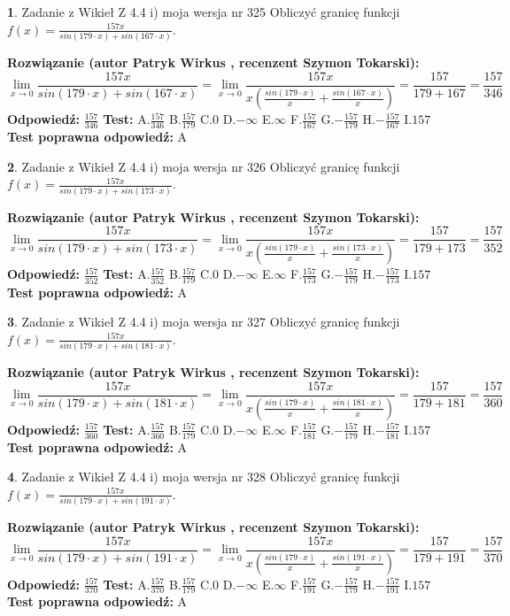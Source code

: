 \documentclass[12pt, a4paper]{article}
\theoremstyle{definition} %
\newtheorem{zad}{}
\newcommand{\zadStart}[1]{\begin{zad}#1\newline}
\newcommand{\zadStop}{\end{zad}}
\newcommand{\rozwStart}[2]{\noindent \textbf{Rozwiązanie (autor #1 , recenzent #2): }\newline}
\newcommand{\rozwStop}{\newline}
\newcommand{\odpStart}{\noindent \textbf{Odpowiedź:}\newline}
\newcommand{\odpStop}{\newline}
\newcommand{\testStart}{\noindent \textbf{Test:}\newline}
\newcommand{\testStop}{\newline}
\newcommand{\kluczStart}{\noindent \textbf{Test poprawna odpowiedź:}\newline}
\newcommand{\kluczStop}{\newline}
\begin{document}
\zadStart{Zadanie z Wikieł Z 4.4 i) moja wersja nr 325}
Obliczyć granicę funkcji $f(x)=\frac{157x}{sin(179\cdot x) +sin(167\cdot x)}$.
\zadStop
\rozwStart{Patryk Wirkus}{Szymon Tokarski}
$$\lim\limits_{x\to 0}\frac{157x}{sin(179\cdot x) +sin(167\cdot x)}=\lim\limits_{x\to 0}\frac{157x}{x(\frac{sin(179\cdot x)}{x}+\frac{sin(167\cdot x)}{x})}=\frac{157}{179+167} = \frac{157}{346}$$
\rozwStop
\odpStart
$\frac{157}{346}$
\odpStop
\testStart
A.$\frac{157}{346}$
B.$\frac{157}{179}$
C.$0$
D.$-\infty$
E.$\infty$
F.$\frac{157}{167}$
G.$-\frac{157}{179}$
H.$-\frac{157}{167}$
I.$157$
\testStop
\kluczStart
A
\kluczStop



\zadStart{Zadanie z Wikieł Z 4.4 i) moja wersja nr 326}
Obliczyć granicę funkcji $f(x)=\frac{157x}{sin(179\cdot x) +sin(173\cdot x)}$.
\zadStop
\rozwStart{Patryk Wirkus}{Szymon Tokarski}
$$\lim\limits_{x\to 0}\frac{157x}{sin(179\cdot x) +sin(173\cdot x)}=\lim\limits_{x\to 0}\frac{157x}{x(\frac{sin(179\cdot x)}{x}+\frac{sin(173\cdot x)}{x})}=\frac{157}{179+173} = \frac{157}{352}$$
\rozwStop
\odpStart
$\frac{157}{352}$
\odpStop
\testStart
A.$\frac{157}{352}$
B.$\frac{157}{179}$
C.$0$
D.$-\infty$
E.$\infty$
F.$\frac{157}{173}$
G.$-\frac{157}{179}$
H.$-\frac{157}{173}$
I.$157$
\testStop
\kluczStart
A
\kluczStop



\zadStart{Zadanie z Wikieł Z 4.4 i) moja wersja nr 327}
Obliczyć granicę funkcji $f(x)=\frac{157x}{sin(179\cdot x) +sin(181\cdot x)}$.
\zadStop
\rozwStart{Patryk Wirkus}{Szymon Tokarski}
$$\lim\limits_{x\to 0}\frac{157x}{sin(179\cdot x) +sin(181\cdot x)}=\lim\limits_{x\to 0}\frac{157x}{x(\frac{sin(179\cdot x)}{x}+\frac{sin(181\cdot x)}{x})}=\frac{157}{179+181} = \frac{157}{360}$$
\rozwStop
\odpStart
$\frac{157}{360}$
\odpStop
\testStart
A.$\frac{157}{360}$
B.$\frac{157}{179}$
C.$0$
D.$-\infty$
E.$\infty$
F.$\frac{157}{181}$
G.$-\frac{157}{179}$
H.$-\frac{157}{181}$
I.$157$
\testStop
\kluczStart
A
\kluczStop



\zadStart{Zadanie z Wikieł Z 4.4 i) moja wersja nr 328}
Obliczyć granicę funkcji $f(x)=\frac{157x}{sin(179\cdot x) +sin(191\cdot x)}$.
\zadStop
\rozwStart{Patryk Wirkus}{Szymon Tokarski}
$$\lim\limits_{x\to 0}\frac{157x}{sin(179\cdot x) +sin(191\cdot x)}=\lim\limits_{x\to 0}\frac{157x}{x(\frac{sin(179\cdot x)}{x}+\frac{sin(191\cdot x)}{x})}=\frac{157}{179+191} = \frac{157}{370}$$
\rozwStop
\odpStart
$\frac{157}{370}$
\odpStop
\testStart
A.$\frac{157}{370}$
B.$\frac{157}{179}$
C.$0$
D.$-\infty$
E.$\infty$
F.$\frac{157}{191}$
G.$-\frac{157}{179}$
H.$-\frac{157}{191}$
I.$157$
\testStop
\kluczStart
A
\kluczStop
\end{document}

